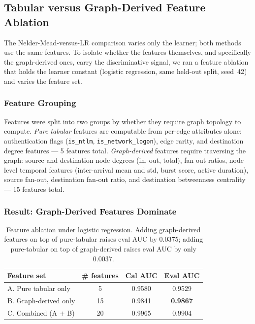 \subsection{Tabular versus Graph-Derived Feature Ablation}
\label{sec:tabular_graph_ablation}

The Nelder-Mead-versus-LR comparison varies only the learner; both methods use the same features. To isolate whether the features themselves, and specifically the graph-derived ones, carry the discriminative signal, we ran a feature ablation that holds the learner constant (logistic regression, same held-out split, seed~42) and varies the feature set.

\subsubsection{Feature Grouping}

Features were split into two groups by whether they require graph topology to compute. \emph{Pure tabular} features are computable from per-edge attributes alone: authentication flags (\texttt{is\_ntlm}, \texttt{is\_network\_logon}), edge rarity, and destination degree features --- 5 features total. \emph{Graph-derived} features require traversing the graph: source and destination node degrees (in, out, total), fan-out ratios, node-level temporal features (inter-arrival mean and std, burst score, active duration), source fan-out, destination fan-out ratio, and destination betweenness centrality --- 15 features total.

\subsubsection{Result: Graph-Derived Features Dominate}

\begin{table}[h]
\centering
\begin{tabular}{lccc}
\hline
Feature set & \# features & Cal AUC & Eval AUC \\
\hline
A. Pure tabular only    & 5  & 0.9580 & 0.9529 \\
B. Graph-derived only   & 15 & 0.9841 & \textbf{0.9867} \\
C. Combined (A $+$ B)  & 20 & 0.9965 & 0.9904 \\
\hline
\end{tabular}
\caption{Feature ablation under logistic regression. Adding graph-derived features on top of pure-tabular raises eval AUC by 0.0375; adding pure-tabular on top of graph-derived raises eval AUC by only 0.0037.}
\label{tab:tabular_graph}
\end{table}

